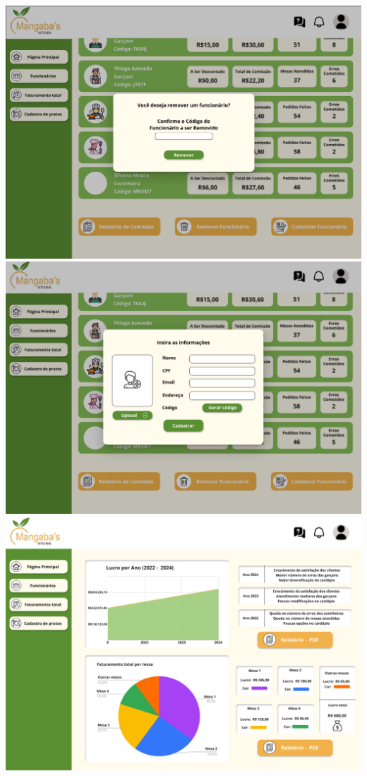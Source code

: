 \begin{center}
    \includegraphics[width=1\textwidth]{imagens-template/Layout_Gerente_2657.png} 
    \includegraphics[width=1\textwidth]{imagens-template/Layout_Gerente_2655.png} 
    \includegraphics[width=1\textwidth]{imagens-template/Layout_Gerente_2653.png} 

\end{center}
